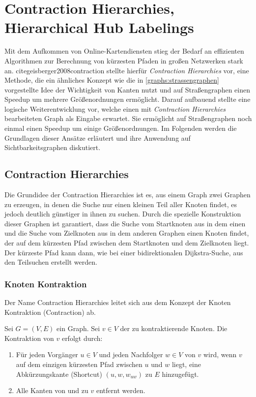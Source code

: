 \chapter{Contraction Hierarchies, Hierarchical Hub Labelings}\label{chapter:ch}

Mit dem Aufkommen von Online-Kartendiensten stieg der Bedarf an effizienten Algorithmen zur Berechnung von kürzesten Pfaden in großen Netzwerken stark an.
cite{geisberger2008contraction} stellte hierfür \emph{Contraction Hierarchies} vor, eine Methode, die ein ähnliches Konzept wie die in \autoref{graphs:strassengraphen} vorgestellte Idee der Wichtigkeit von Kanten nutzt und auf Straßengraphen einen Speedup um mehrere Größenordnungen ermöglicht.
Darauf aufbauend stellte \cite{abraham2011hub} eine logische Weiterentwicklung vor, welche einen mit \emph{Contraction Hierarchies} bearbeiteten Graph als Eingabe erwartet.
Sie ermöglicht auf Straßengraphen noch einmal einen Speedup um einige Größenordnungen.
Im Folgenden werden die Grundlagen dieser Ansätze erläutert und ihre Anwendung auf Sichtbarkeitsgraphen diskutiert.

\section{Contraction Hierarchies}

Die Grundidee der Contraction Hierarchies ist es, aus einem Graph zwei Graphen zu erzeugen, in denen die Suche nur einen kleinen Teil aller Knoten findet, es jedoch deutlich günstiger in ihnen zu suchen.
Durch die spezielle Konstruktion dieser Graphen ist garantiert, dass die Suche vom Startknoten aus in dem einen und die Suche vom Zielknoten aus in dem anderen Graphen einen Knoten findet, der auf dem kürzesten Pfad zwischen dem Startknoten und dem Zielknoten liegt.
Der kürzeste Pfad kann dann, wie bei einer bidirektionalen Dijkstra-Suche, aus den Teilsuchen erstellt werden.

\subsection{Knoten Kontraktion}

Der Name Contraction Hierarchies leitet sich aus dem Konzept der Knoten Kontraktion (Contraction) ab.

\begin{definition}
    Sei $G = (V, E)$ ein Graph. Sei $v \in V$ der zu kontraktierende Knoten. Die Kontraktion von $v$ erfolgt durch:

    \begin{enumerate}
        \item\label{ch:contraction:when_shortcut}
        Für jeden Vorgänger $u \in V$ und jeden Nachfolger $w \in V$ von $v$ wird, wenn $v$ auf dem einzigen kürzesten Pfad zwischen $u$ und $w$ liegt, eine Abkürzungskante (Shortcut) $(u, w, w_{uw})$ zu $E$ hinzugefügt.

        \item
              Alle Kanten von und zu $v$ entfernt werden.
    \end{enumerate}
\end{definition}


